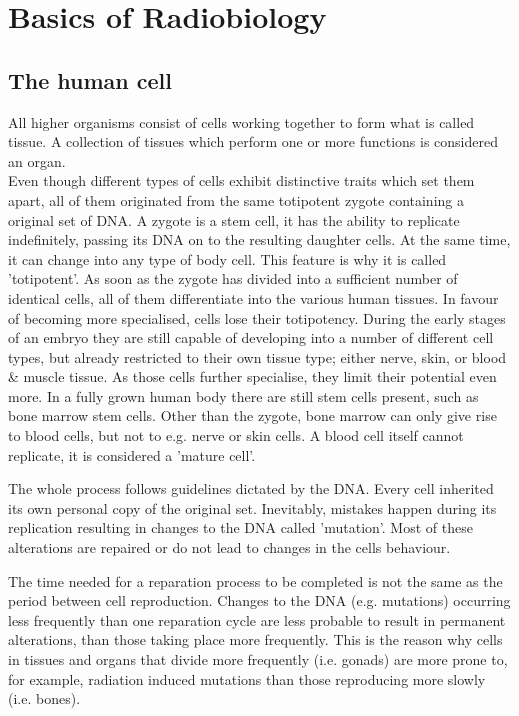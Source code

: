 \section{Basics of Radiobiology}
\label{sec:cell}
\subsection{The human cell}
All higher organisms consist of cells working together to form what is called tissue.
A collection of tissues which perform one or more functions is considered an organ. \\

Even though different types of cells exhibit distinctive traits which set them apart, all of them originated from the same totipotent zygote containing a original set of DNA.
A zygote is a stem cell, it has the ability to replicate indefinitely, passing its DNA on to the resulting daughter cells.
At the same time, it can change into any type of body cell. This feature is why it is called 'totipotent'.
As soon as the zygote has divided into a sufficient number of identical cells, all of them differentiate into the various human tissues.
In favour of becoming more specialised, cells lose their totipotency.
During the early stages of an embryo they are still capable of developing into a number of different cell types, but already restricted to their own tissue type; either nerve, skin, or blood \& muscle tissue.
As those cells further specialise, they limit their potential even more.
In a fully grown human body there are still stem cells present, such as bone marrow stem cells.
Other than the zygote, bone marrow can only give rise to blood cells, but not to e.g. nerve or skin cells.
A blood cell itself cannot replicate, it is considered a 'mature cell'.

The whole process follows guidelines dictated by the DNA.
Every cell inherited its own personal copy of the original set.
Inevitably, mistakes happen during its replication resulting in changes to the DNA called 'mutation'.
Most of these alterations are repaired or do not lead to changes in the cells behaviour.

The time needed for a reparation process to be completed is not the same as the period between cell reproduction. Changes to the DNA (e.g. mutations) occurring less frequently than one reparation cycle are less probable to result in permanent alterations, than those taking place more frequently. This is the reason why cells in tissues and organs that divide more frequently (i.e. gonads) are more prone to, for example, radiation induced mutations than those reproducing more slowly (i.e. bones).


